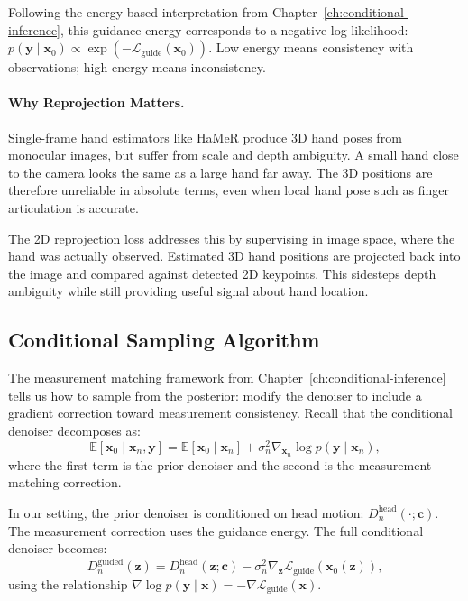\documentclass[../../book-main.tex]{subfiles}
\begin{document}
Following the energy-based interpretation from
Chapter~\ref{ch:conditional-inference}, this guidance energy
corresponds to a negative log-likelihood: $p(\boldsymbol{y} \mid
\boldsymbol{x}_0) \propto
\exp(-\mathcal{L}_{\text{guide}}(\boldsymbol{x}_0))$. Low
energy means consistency with observations; high energy means inconsistency.

\paragraph{Why Reprojection Matters.}
Single-frame hand estimators like HaMeR produce 3D hand poses from
monocular images, but suffer from scale and depth ambiguity. A small
hand close to the camera looks the same as a large hand far away. The
3D positions are therefore unreliable in absolute terms, even when
local hand pose such as finger articulation is accurate.

The 2D reprojection loss addresses this by supervising in image
space, where the hand was actually observed. Estimated 3D hand
positions are projected back into the image and compared against
detected 2D keypoints. This sidesteps depth ambiguity while still
providing useful signal about hand location.

\subsection{Conditional Sampling Algorithm}
\label{sub:egoallo_sampling}

The measurement matching framework from
Chapter~\ref{ch:conditional-inference} tells us how to sample from
the posterior: modify the denoiser to include a gradient correction
toward measurement consistency. Recall that the conditional denoiser
decomposes as:
\begin{equation}
\mathbb{E}[\boldsymbol{x}_0 \mid \boldsymbol{x}_n, \boldsymbol{y}]
=
\mathbb{E}[\boldsymbol{x}_0 \mid \boldsymbol{x}_n]
+
\sigma_n^2 \nabla_{\boldsymbol{x}_n} \log p(\boldsymbol{y} \mid
\boldsymbol{x}_n),
\end{equation}
where the first term is the prior denoiser and the second is the
measurement matching correction.

In our setting, the prior denoiser is conditioned on head motion:
$D_n^{\text{head}}(\cdot; \boldsymbol{c})$. The measurement correction uses
the guidance energy. The full conditional denoiser becomes:
\begin{equation}
D_n^{\text{guided}}(\boldsymbol{z})
=
D_n^{\text{head}}(\boldsymbol{z};\boldsymbol{c})
-
\sigma_n^2
\nabla_{\boldsymbol{z}}
\mathcal{L}_{\text{guide}}(\boldsymbol{x}_0(\boldsymbol{z})),
\end{equation}
using the relationship $\nabla \log p(\boldsymbol{y} \mid \boldsymbol{x}) =
-\nabla \mathcal{L}_{\text{guide}}(\boldsymbol{x})$.
\end{document}
